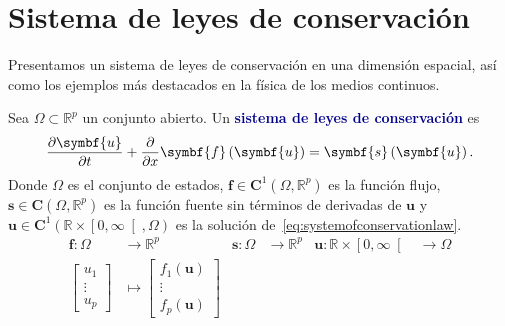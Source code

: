 \chapter{Sistema de leyes de conservación}

Presentamos un sistema de leyes de conservación en una dimensión
espacial, así como los ejemplos más destacados en la física de los
medios continuos.

\begin{definition}
	Sea $\Omega\subset\mathbb{R}^{p}$ un conjunto abierto.
	Un \textcolor{DarkBlue}{\bfseries sistema de leyes de conservación}
	 es
	\begin{equation}\label{eq:systemofconservationlaw}
		\diffp{\symbf{u}}{t}+
		\diffp{}{x}
		\symbf{f}\left(\symbf{u}\right)=
		\symbf{s}\left(\symbf{u}\right).
	\end{equation}
	Donde $\Omega$ es el conjunto de estados,
	\begin{math}
		\symbf{f}\in\symbf{C}^{1}
		\left(\Omega,\mathbb{R}^{p}\right)
	\end{math}
	es la función flujo,
	\begin{math}
		\symbf{s}\in
		\symbf{C}
		\left(\Omega,\mathbb{R}^{p}\right)
	\end{math}
	es la función fuente sin términos de derivadas de $\symbf{u}$ y
	\begin{math}
		\symbf{u}\in
		\symbf{C}^{1}
		\left(\mathbb{R}\times\left[0,\infty\right[,\Omega\right)
	\end{math} es la solución de~\eqref{eq:systemofconservationlaw}.
	\begin{align*}
		\symbf{f}\colon\Omega                                &
		\longrightarrow\mathbb{R}^{p}                        &
		\symbf{s}\colon\Omega                                &
		\longrightarrow\mathbb{R}^{p}                        &
		\symbf{u}\colon\mathbb{R}\times\left[0,\infty\right[ &
		\longrightarrow\Omega                                  \\
		\begin{bmatrix}
			u_{1}  \\
			\vdots \\
			u_{p}
		\end{bmatrix}                                      &
		\longmapsto
		\begin{bmatrix}
			f_{1}\left(\symbf{u}\right) \\
			\vdots                      \\
			f_{p}\left(\symbf{u}\right)

\end{bmatrix}
\end{align*}
\end{definition}
